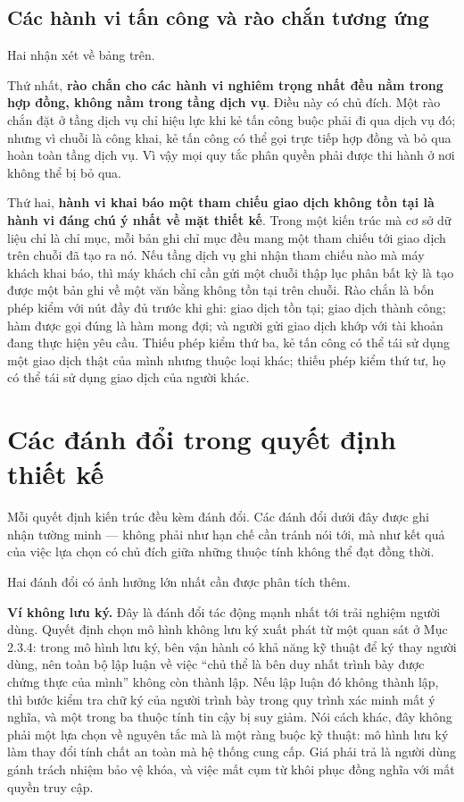 \subsection{Các hành vi tấn công và rào chắn tương ứng}



Hai nhận xét về bảng trên.

Thứ nhất, \textbf{rào chắn cho các hành vi nghiêm trọng nhất đều nằm trong hợp đồng, không nằm trong tầng dịch vụ}. Điều này có chủ đích. Một rào chắn đặt ở tầng dịch vụ chỉ hiệu lực khi kẻ tấn công buộc phải đi qua dịch vụ đó; nhưng vì chuỗi là công khai, kẻ tấn công có thể gọi trực tiếp hợp đồng và bỏ qua hoàn toàn tầng dịch vụ. Vì vậy mọi quy tắc phân quyền phải được thi hành ở nơi không thể bị bỏ qua.

Thứ hai, \textbf{hành vi khai báo một tham chiếu giao dịch không tồn tại là hành vi đáng chú ý nhất về mặt thiết kế}. Trong một kiến trúc mà cơ sở dữ liệu chỉ là chỉ mục, mỗi bản ghi chỉ mục đều mang một tham chiếu tới giao dịch trên chuỗi đã tạo ra nó. Nếu tầng dịch vụ ghi nhận tham chiếu nào mà máy khách khai báo, thì máy khách chỉ cần gửi một chuỗi thập lục phân bất kỳ là tạo được một bản ghi về một văn bằng không tồn tại trên chuỗi. Rào chắn là bốn phép kiểm với nút đầy đủ trước khi ghi: giao dịch tồn tại; giao dịch thành công; hàm được gọi đúng là hàm mong đợi; và người gửi giao dịch khớp với tài khoản đang thực hiện yêu cầu. Thiếu phép kiểm thứ ba, kẻ tấn công có thể tái sử dụng một giao dịch thật của mình nhưng thuộc loại khác; thiếu phép kiểm thứ tư, họ có thể tái sử dụng giao dịch của người khác.

\section{Các đánh đổi trong quyết định thiết kế}

Mỗi quyết định kiến trúc đều kèm đánh đổi. Các đánh đổi dưới đây được ghi nhận tường minh --- không phải như hạn chế cần tránh nói tới, mà như kết quả của việc lựa chọn có chủ đích giữa những thuộc tính không thể đạt đồng thời.



Hai đánh đổi có ảnh hưởng lớn nhất cần được phân tích thêm.

\noindent \textbf{Ví không lưu ký.} Đây là đánh đổi tác động mạnh nhất tới trải nghiệm người dùng. Quyết định chọn mô hình không lưu ký xuất phát từ một quan sát ở Mục 2.3.4: trong mô hình lưu ký, bên vận hành có khả năng kỹ thuật để ký thay người dùng, nên toàn bộ lập luận về việc {``}chủ thể là bên duy nhất trình bày được chứng thực của mình{''} không còn thành lập. Nếu lập luận đó không thành lập, thì bước kiểm tra chữ ký của người trình bày trong quy trình xác minh mất ý nghĩa, và một trong ba thuộc tính tin cậy bị suy giảm. Nói cách khác, đây không phải một lựa chọn về nguyên tắc mà là một ràng buộc kỹ thuật: mô hình lưu ký làm thay đổi tính chất an toàn mà hệ thống cung cấp. Giá phải trả là người dùng gánh trách nhiệm bảo vệ khóa, và việc mất cụm từ khôi phục đồng nghĩa với mất quyền truy cập.

